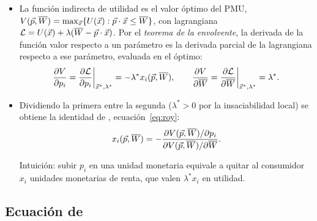 \documentclass[11pt]{article}
\begin{document}
\begin{itemize}
\item La función indirecta de utilidad es el valor óptimo del PMU, $V(\vec{p},\overline{W})=\max_{\vec{x}}\{U(\vec{x}): \vec{p}\cdot \vec{x}\leq\overline{W}\}$, con lagrangiana $\mathcal{L}=U(\vec{x})+\lambda(\overline{W}-\vec{p}\cdot \vec{x})$. Por el \emph{teorema de la envolvente}, la derivada de la función valor respecto a un parámetro es la derivada parcial de la lagrangiana respecto a ese parámetro, evaluada en el óptimo:
  \begin{equation*}
  \frac{\partial V}{\partial p_i}=\frac{\partial\mathcal{L}}{\partial p_i}\bigg|_{\vec{x}^*,\lambda^*}=-\lambda^*x_i(\vec{p},\overline{W}),\qquad\frac{\partial V}{\partial\overline{W}}=\frac{\partial\mathcal{L}}{\partial\overline{W}}\bigg|_{\vec{x}^*,\lambda^*}=\lambda^*.
  \end{equation*}
\item Dividiendo la primera entre la segunda ($\lambda^*>0$ por la insaciabilidad local) se obtiene la identidad de , ecuación~\eqref{eq:roy}:
  \begin{equation*}
  x_i(\vec{p},\overline{W})=-\frac{\partial V(\vec{p},\overline{W})/\partial p_i}{\partial V(\vec{p},\overline{W})/\partial\overline{W}}.
  \end{equation*}
  \findemo

  Intuición: subir $p_i$ en una unidad monetaria equivale a quitar al consumidor $x_i$ unidades monetarias de renta, que valen $\lambda^*x_i$ en utilidad.
\end{itemize}

\subsection{Ecuación de }\label{der:slutsky}
\end{document}
